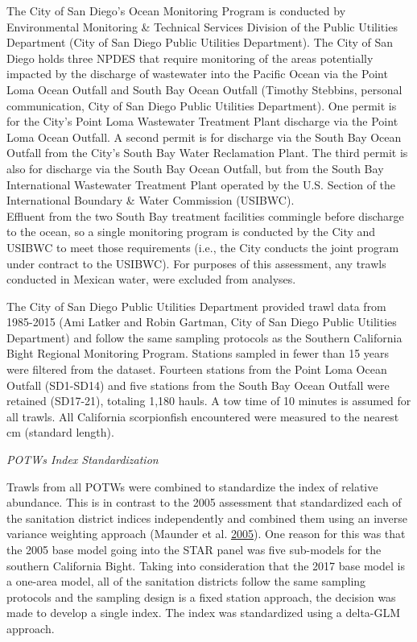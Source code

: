 \documentclass[12pt,]{article}
\begin{document}
The City of San Diego's Ocean Monitoring Program is conducted by
Environmental Monitoring \& Technical Services Division of the Public
Utilities Department (City of San Diego Public Utilities Department).
The City of San Diego holds three NPDES that require monitoring of the
areas potentially impacted by the discharge of wastewater into the
Pacific Ocean via the Point Loma Ocean Outfall and South Bay Ocean
Outfall (Timothy Stebbins, personal communication, City of San Diego
Public Utilities Department). One permit is for the City's Point Loma
Wastewater Treatment Plant discharge via the Point Loma Ocean Outfall. A
second permit is for discharge via the South Bay Ocean Outfall from the
City's South Bay Water Reclamation Plant. The third permit is also for
discharge via the South Bay Ocean Outfall, but from the South Bay
International Wastewater Treatment Plant operated by the U.S. Section of
the International Boundary \& Water Commission (USIBWC).\\
Effluent from the two South Bay treatment facilities commingle before
discharge to the ocean, so a single monitoring program is conducted by
the City and USIBWC to meet those requirements (i.e., the City conducts
the joint program under contract to the USIBWC). For purposes of this
assessment, any trawls conducted in Mexican water, were excluded from
analyses.

The City of San Diego Public Utilities Department provided trawl data
from 1985-2015 (Ami Latker and Robin Gartman, City of San Diego Public
Utilities Department) and follow the same sampling protocols as the
Southern California Bight Regional Monitoring Program. Stations sampled
in fewer than 15 years were filtered from the dataset. Fourteen stations
from the Point Loma Ocean Outfall (SD1-SD14) and five stations from the
South Bay Ocean Outfall were retained (SD17-21), totaling 1,180 hauls. A
tow time of 10 minutes is assumed for all trawls. All California
scorpionfish encountered were measured to the nearest cm (standard
length).

\emph{POTWs Index Standardization}

Trawls from all POTWs were combined to standardize the index of relative
abundance. This is in contrast to the 2005 assessment that standardized
each of the sanitation district indices independently and combined them
using an inverse variance weighting approach (Maunder et al.
\protect\hyperlink{ref-Maunder2005}{2005}). One reason for this was that
the 2005 base model going into the STAR panel was five sub-models for
the southern California Bight. Taking into consideration that the 2017
base model is a one-area model, all of the sanitation districts follow
the same sampling protocols and the sampling design is a fixed station
approach, the decision was made to develop a single index. The index was
standardized using a delta-GLM approach.
\end{document}
